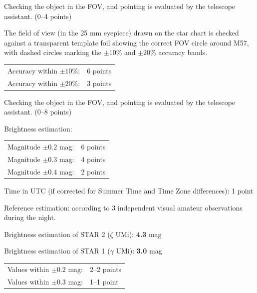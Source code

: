 Checking the object in the FOV, and pointing is evaluated by the telescope
assistant. \hfill(0--4 points)

The field of view (in the 25 mm eyepiece) drawn on the star chart is checked
against a transparent template foil showing the correct FOV circle around
M57, with dashed circles marking the $\pm 10$\% and $\pm 20$\% accuracy
bands.


\begin{center}
\begin{tabular}{ll}
Accuracy within $\pm 10$\%: & 6 points \\
Accuracy within $\pm 20$\%: & 3 points \\
\end{tabular}
\end{center}

Checking the object in the FOV, and pointing is evaluated by the telescope
assistant. \hfill(0--8 points)

Brightness estimation:
\begin{center}
\begin{tabular}{ll}
Magnitude $\pm 0.2$ mag: & 6 points \\
Magnitude $\pm 0.3$ mag: & 4 points \\
Magnitude $\pm 0.4$ mag: & 2 points \\
\end{tabular}
\end{center}

Time in UTC (if corrected for Summer Time and Time Zone differences):
\hfill 1 point

Reference estimation: according to 3 independent visual amateur observations
during the night.

Brightness estimation of STAR 2 ($\zeta$ UMi): \textbf{4.3} mag

Brightness estimation of STAR 1 ($\gamma$ UMi): \textbf{3.0} mag

\begin{center}
\begin{tabular}{ll}
Values within $\pm 0.2$ mag: & 2--2 points \\
Values within $\pm 0.3$ mag: & 1--1 point \\
\end{tabular}
\end{center}

